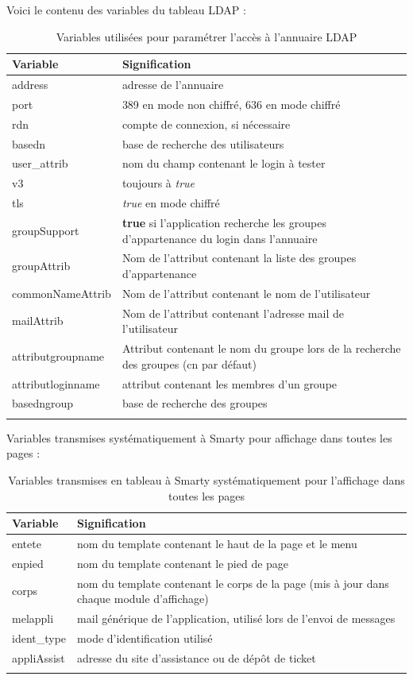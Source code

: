 Voici le contenu des variables du tableau LDAP : 
\begin{longtable}{|p{5cm}|p{8cm}|}
\hline
\textbf{Variable} & \textbf{Signification} \\
\hline
\endhead
address &  adresse de l'annuaire\\
\hline
port & 389 en mode non chiffré, 636 en mode chiffré\\
\hline
rdn & compte de connexion, si nécessaire \\
\hline
basedn & base de recherche des utilisateurs\\
\hline
user\_attrib & nom du champ contenant le login à tester\\
\hline
v3 & toujours à \textit{true}\\
\hline
tls & \textit{true} en mode chiffré\\
\hline
groupSupport & \textbf{true} si l'application recherche les groupes d'appartenance du login dans l'annuaire\\
\hline
groupAttrib & Nom de l'attribut contenant la liste des groupes d'appartenance\\
\hline
commonNameAttrib & Nom de l'attribut contenant le nom de l'utilisateur\\
\hline
mailAttrib & Nom de l'attribut contenant l'adresse mail de l'utilisateur\\
\hline
attributgroupname & Attribut contenant le nom du groupe lors de la recherche des groupes (cn par défaut)\\
\hline
attributloginname & attribut contenant les membres d'un groupe\\
\hline
basedngroup & base de recherche des groupes \\
\hline
\caption{Variables utilisées pour paramétrer l'accès à l'annuaire LDAP}
\end{longtable}

Variables transmises systématiquement à Smarty pour affichage dans toutes les pages :

\begin{longtable}{|p{5cm}|p{8cm}|}
\hline
\textbf{Variable} & \textbf{Signification} \\
\hline
\endhead
entete & nom du template contenant le haut de la page et le menu \\
\hline
enpied & nom du template contenant le pied de page \\
\hline
corps & nom du template contenant le corps de la page (mis à jour dans chaque module d'affichage)\\
\hline
melappli & mail générique de l'application, utilisé lors de l'envoi de messages \\
\hline
ident\_type & mode d'identification utilisé \\
\hline
appliAssist & adresse du site d'assistance ou de dépôt de ticket \\
\hline
\caption{Variables transmises en tableau à Smarty systématiquement pour l'affichage dans toutes les pages}
\end{longtable}


